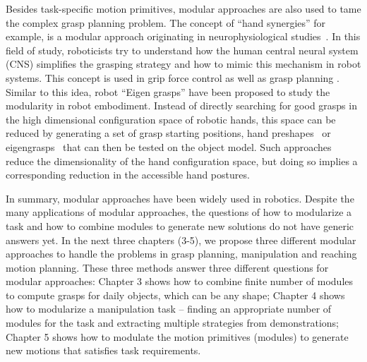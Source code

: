 Besides task-specific motion primitives, modular approaches are also used to tame the complex grasp planning problem. The concept of ``hand synergies'' for example, is a modular approach originating in neurophysiological studies~\citep{santello1998postural,santello2000force}. In this field of study, roboticists try to understand how the human central neural system (CNS) simplifies the grasping strategy and how to mimic this mechanism in robot systems. This concept is used in grip force control \citep{gabiccini2011role} as well as grasp planning \citep{gioioso2013mapping}. Similar to this idea, robot ``Eigen grasps'' have been proposed to study the modularity in robot embodiment. Instead of directly searching for good grasps in the high dimensional configuration space of robotic hands, this space can be reduced by generating a set of grasp starting positions, hand preshapes~\cite{miller2003automatic} or eigengrasps~\cite{Ciocarlie2009} that can then be tested on the object model. Such approaches reduce the dimensionality of the hand configuration space, but doing so implies a corresponding reduction in the accessible hand postures.

In summary, modular approaches have been widely used in robotics. Despite the many applications of modular approaches, the questions of how to modularize a task and how to combine modules to generate new solutions do not have generic answers yet. In the next three chapters (3-5), we propose three different modular approaches to handle the problems in grasp planning, manipulation and reaching motion planning. These three methods answer three different questions for modular approaches: Chapter 3 shows how to combine finite number of modules to compute grasps for daily objects, which can be any shape; Chapter 4 shows how to modularize a manipulation task -- finding an appropriate number of modules for the task and extracting multiple strategies from demonstrations; Chapter 5 shows how to modulate the motion primitives (modules) to generate new motions that satisfies task requirements.


